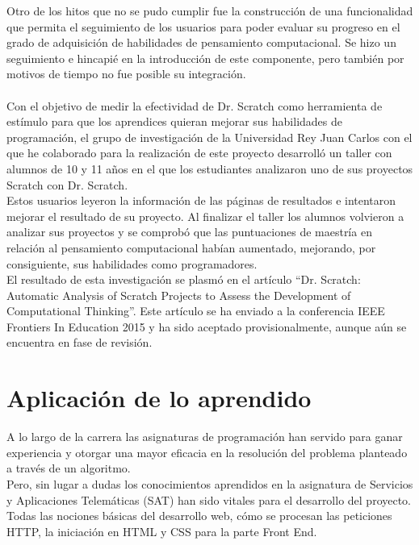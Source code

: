 \documentclass[a4paper, 12pt]{book}
\begin{document}
Otro de los hitos que no se pudo cumplir fue la construcción de una
funcionalidad que permita el seguimiento de los usuarios para poder
evaluar su progreso en el grado de adquisición de habilidades de 
pensamiento computacional. Se hizo un seguimiento e hincapié en la 
introducción de este componente, pero también por motivos de tiempo
no fue posible su integración. \\ \\


Con el objetivo de medir la efectividad de Dr. Scratch como herramienta 
de estímulo para que los aprendices quieran mejorar sus habilidades de 
programación, el grupo de investigación de la Universidad Rey Juan Carlos
con el que he colaborado para la realización de este proyecto desarrolló 
un taller con alumnos de 10 y 11 años en el que los estudiantes analizaron 
uno de sus proyectos Scratch con Dr. Scratch. \\

Estos usuarios leyeron la información de las páginas de resultados e 
intentaron mejorar el resultado de su proyecto. Al finalizar el taller 
los alumnos volvieron a analizar sus proyectos y se comprobó que las 
puntuaciones de maestría en relación al pensamiento computacional habían
aumentado, mejorando, por consiguiente, sus habilidades como programadores. \\


El resultado de esta investigación se plasmó en el artículo 
"`Dr. Scratch: Automatic Analysis of Scratch Projects to Assess the 
Development of Computational Thinking"'. Este artículo se ha enviado a la
conferencia IEEE Frontiers In Education 2015 y ha sido aceptado 
provisionalmente, aunque aún se encuentra en fase de revisión.

\section{Aplicación de lo aprendido}
\label{sec:aplicacion}

A lo largo de la carrera las asignaturas de programación han servido para
ganar experiencia y otorgar una mayor eficacia en la resolución del problema
planteado a través de un algoritmo. \\

Pero, sin lugar a dudas los conocimientos aprendidos en la asignatura de Servicios
y Aplicaciones Telemáticas (SAT) han sido vitales para el desarrollo del 
proyecto. Todas las nociones básicas del desarrollo web, cómo se procesan
las peticiones HTTP, la iniciación en HTML y CSS para la parte Front End. \\
\end{document}
